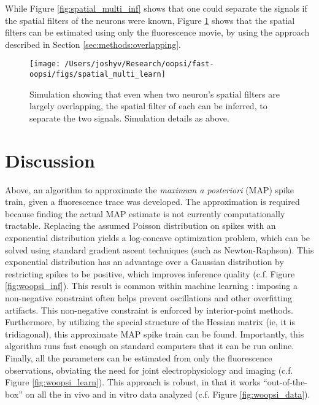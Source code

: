 While Figure \ref{fig:spatial_multi_inf} shows that one could separate the signals if the spatial filters of the neurons were known, Figure \ref{fig:spatial_multi_learn} shows that the spatial filters can be estimated using only the fluorescence movie, by using the approach described in Section \ref{sec:methods:overlapping}.


\begin{figure}[h!]
\centering \texttt{[image: /Users/joshyv/Research/oopsi/fast-oopsi/figs/spatial\_multi\_learn]}
\caption[overlapping spatial filters can be estimated]{Simulation showing that even when two neuron's spatial filters are largely overlapping, the spatial filter of each can be inferred, to separate the two signals. Simulation details as above.} \label{fig:spatial_multi_learn}
\end{figure}





\section{Discussion} \label{sec:dis}


Above, an algorithm to approximate the \emph{maximum a posteriori} (MAP) spike train, given a fluorescence trace was developed.  The approximation is required because finding the actual MAP estimate is not currently computationally tractable.  Replacing the assumed Poisson distribution on spikes with an exponential distribution yields a log-concave optimization problem, which can be solved using standard gradient ascent techniques (such as Newton-Raphson).  This exponential distribution has an advantage over a Gaussian distribution by restricting spikes to be positive, which improves inference quality (c.f. Figure \ref{fig:woopsi_inf}).  This result is common within machine learning \cite{Hoyer04,OGradyPearlmutter06}: imposing a non-negative constraint often helps prevent oscillations and other overfitting artifacts. This non-negative constraint is enforced by interior-point methods.  Furthermore, by utilizing the special structure of the Hessian matrix (ie, it is tridiagonal), this approximate MAP spike train can be found.  Importantly, this algorithm runs fast enough on standard computers that it can be run online.  Finally, all the parameters can be estimated from only the fluorescence observations, obviating the need for joint electrophysiology and imaging (c.f. Figure \ref{fig:woopsi_learn}).  This approach is robust, in that it works ``out-of-the-box'' on all the in vivo and in vitro data analyzed (c.f. Figure \ref{fig:woopsi_data}).

